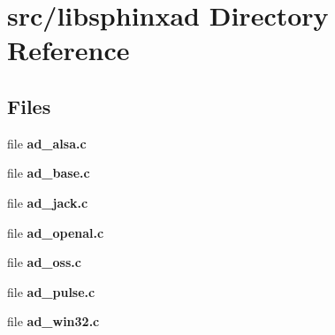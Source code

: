 \section{src/libsphinxad Directory Reference}
\label{dir_6b434913578e1a30215dcd3a2a20216a}
\subsection*{Files}
\begin{DoxyCompactItemize}
\item 
file {\bfseries ad\+\_\+alsa.\+c}
\item 
file {\bfseries ad\+\_\+base.\+c}
\item 
file {\bfseries ad\+\_\+jack.\+c}
\item 
file {\bfseries ad\+\_\+openal.\+c}
\item 
file {\bfseries ad\+\_\+oss.\+c}
\item 
file {\bfseries ad\+\_\+pulse.\+c}
\item 
file {\bfseries ad\+\_\+win32.\+c}
\end{DoxyCompactItemize}
